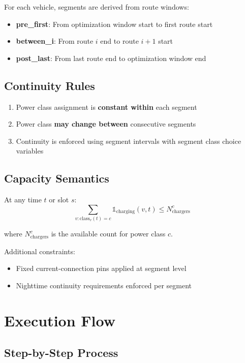 \documentclass[11pt,a4paper]{article}
\begin{document}
For each vehicle, segments are derived from route windows:

\begin{itemize}
    \item \textbf{pre\_first}: From optimization window start to first route start
    \item \textbf{between\_i}: From route $i$ end to route $i+1$ start
    \item \textbf{post\_last}: From last route end to optimization window end
\end{itemize}

\subsection{Continuity Rules}

\begin{enumerate}
    \item Power class assignment is \textbf{constant within} each segment
    \item Power class \textbf{may change between} consecutive segments
    \item Continuity is enforced using segment intervals with segment class choice variables
\end{enumerate}

\subsection{Capacity Semantics}

At any time $t$ or slot $s$:
\begin{equation}
\sum_{v : \text{class}_v(t) = c} \mathbb{1}_{\text{charging}}(v,t) \leq N_{\text{chargers}}^c
\end{equation}

where $N_{\text{chargers}}^c$ is the available count for power class $c$.

Additional constraints:
\begin{itemize}
    \item Fixed current-connection pins applied at segment level
    \item Nighttime continuity requirements enforced per segment
\end{itemize}

\section{Execution Flow}

\subsection{Step-by-Step Process}
\end{document}
